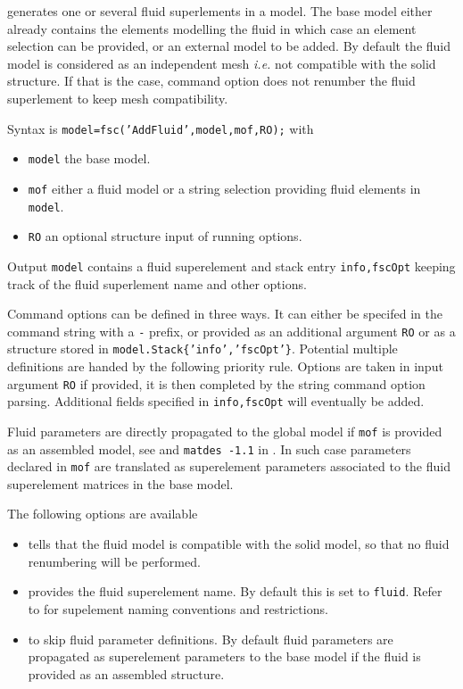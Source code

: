 \begin{SDT}


 generates one or several fluid superlements in a model. The base model either already contains the elements modelling the fluid in which case an element selection can be provided, or an external model to be added. By default the fluid model is considered as an independent mesh {\it i.e.} not compatible with the solid structure. If that is the case, command option  does not renumber the fluid superlement to keep mesh compatibility.

Syntax is {\tt model=fsc('AddFluid',model,mof,RO);} with
\begin{itemize}
\item {\tt model} the base model.
\item {\tt mof} either a fluid model or a string  selection providing fluid elements in {\tt model}.
\item {\tt RO} an optional structure input of running options.
\end{itemize}

Output {\tt model} contains a fluid superelement and stack entry {\tt info,fscOpt} keeping track of the fluid superlement name and other options.

Command options can be defined in three ways. It can either be specifed in the  command string with a {\tt -} prefix, or provided as an additional argument {\tt RO} or as a structure stored in {\tt model.Stack\{'info','fscOpt'\}}. Potential multiple definitions are handed by the following priority rule. Options are taken in input argument {\tt RO} if provided, it is then completed by the string command option parsing.  Additional fields specified in {\tt info,fscOpt} will eventually be added.

Fluid parameters are directly propagated to the global model if {\tt mof} is provided as an assembled model, see  and {\tt matdes -1.1} in . In such case parameters declared in {\tt mof} are translated as superelement parameters associated to the fluid superelement matrices in the base model.

The following options are available
\begin{itemize}
\item {} tells that the fluid model is compatible with the solid model, so that no fluid renumbering will be performed.
\item {} provides the fluid superelement name. By default this is set to {\tt fluid}. Refer to  for supelement naming conventions and restrictions.
\item {} to skip fluid parameter definitions. By default fluid parameters are propagated as superelement parameters to the base model if the fluid is provided as an assembled structure.
\end{itemize}


\end{SDT}
